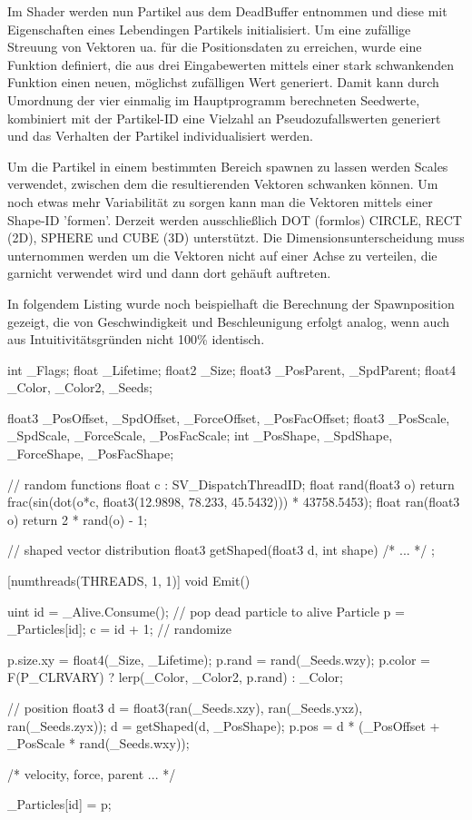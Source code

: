 Im Shader werden nun Partikel aus dem DeadBuffer entnommen und diese mit Eigenschaften eines Lebendingen Partikels initialisiert. Um eine zufällige Streuung von Vektoren ua. für die Positionsdaten zu erreichen, wurde eine Funktion definiert, die aus drei Eingabewerten mittels einer stark schwankenden Funktion einen neuen, möglichst zufälligen Wert generiert. Damit kann durch Umordnung der vier einmalig im Hauptprogramm berechneten Seedwerte, kombiniert mit der Partikel-ID eine Vielzahl an Pseudozufallswerten generiert und das Verhalten der Partikel individualisiert werden.

Um die Partikel in einem bestimmten Bereich spawnen zu lassen werden Scales verwendet, zwischen dem die resultierenden Vektoren schwanken können. Um noch etwas mehr Variabilität zu sorgen kann man die Vektoren mittels einer Shape-ID 'formen'. Derzeit werden ausschlie{\ss}lich DOT (formlos) CIRCLE, RECT (2D), SPHERE und CUBE (3D) unterstützt. Die Dimensionsunterscheidung muss unternommen werden um die Vektoren nicht auf einer Achse zu verteilen, die garnicht verwendet wird und dann dort gehäuft auftreten.

In folgendem Listing wurde noch beispielhaft die Berechnung der Spawnposition gezeigt, die von Geschwindigkeit und Beschleunigung erfolgt analog, wenn auch aus Intuitivitätsgründen nicht 100\% identisch.

\begin{hlsl}[caption=Compute Emit Kernel]
int _Flags;
float _Lifetime;
float2 _Size;
float3 _PosParent, _SpdParent;
float4 _Color, _Color2, _Seeds;

float3 _PosOffset, _SpdOffset, _ForceOffset, _PosFacOffset;
float3 _PosScale, _SpdScale, _ForceScale, _PosFacScale;
int _PosShape, _SpdShape, _ForceShape, _PosFacShape;

// random functions
float c : SV_DispatchThreadID;
float rand(float3 o) {
    return frac(sin(dot(o*c, float3(12.9898, 78.233, 45.5432))) * 43758.5453);
}
float ran(float3 o) { return 2 * rand(o) - 1; }

// shaped vector distribution
float3 getShaped(float3 d, int shape) { /* ... */ };

[numthreads(THREADS, 1, 1)]
void Emit()
{
    uint id = _Alive.Consume(); // pop dead particle to alive
    Particle p = _Particles[id];
    c = id + 1; // randomize
    
    p.size.xy = float4(_Size, _Lifetime);
    p.rand = rand(_Seeds.wzy);
    p.color = F(P_CLRVARY) ? lerp(_Color, _Color2, p.rand) : _Color;
    
    // position
    float3 d = float3(ran(_Seeds.xzy), ran(_Seeds.yxz), ran(_Seeds.zyx));
    d = getShaped(d, _PosShape);
    p.pos = d * (_PosOffset + _PosScale * rand(_Seeds.wxy));
    
    /* velocity, force, parent ... */
    
    _Particles[id] = p;
}
\end{hlsl}



